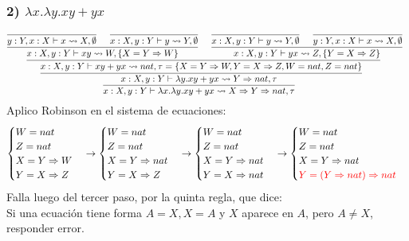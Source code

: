 \documentclass[a4paper,10pt]{article} %
\newcommand{\En}[0]{\Rightarrow}
\begin{document}
\subsubsection*{2) $\lambda x.\lambda y .xy+yx$}
$$
\infer[]{
\infer[]{
    \infer[]{x:X,y:Y\vdash \lambda x.\lambda y.xy+yx \leadsto X \En Y \En nat,\tau}{
        x:X,y:Y\vdash \lambda y.xy+yx \leadsto Y \En nat,\tau}}{
        x:X,y:Y\vdash xy+yx \leadsto nat, \tau =\{X=Y \En W,Y=X \En Z,W=nat,Z=nat\}}}
{
\infer[]{ x:X,y:Y\vdash xy \leadsto W,\{X=Y \En W\}}{
    \infer[]{y:Y,x:X\vdash x\leadsto X,\emptyset}{} & \infer[]{x:X,y:Y\vdash y\leadsto Y,\emptyset}{}}
&
\infer[]{ x:X,y:Y\vdash yx \leadsto Z,\{Y=X \En Z\}}{
\infer[]{x:X,y:Y\vdash y\leadsto Y,\emptyset}{} & \infer[]{y:Y,x:X\vdash x\leadsto X,\emptyset}{}}
}
$$
Aplico Robinson en el sistema de ecuaciones:
\begin{equation*}
    \begin{cases}
    W=nat\\
    Z=nat\\
    X=Y \En W \\
    Y=X \En Z \\
  \end{cases}
  \to
  \begin{cases}
    W=nat\\
    Z=nat\\
    X=Y \En nat \\
    Y=X \En Z \\
  \end{cases}
  \to
  \begin{cases}
    W=nat\\
    Z=nat\\
    X=Y \En nat \\
    Y=X \En nat \\
  \end{cases}
  \to
  \begin{cases}
    W=nat\\
    Z=nat\\
    X=Y \En nat \\
    \color{red}Y=(Y \En nat) \En nat \\
  \end{cases}
\end{equation*}
Falla luego del tercer paso, por la quinta regla, que dice:\\
Si una ecuación tiene forma $A = X, X = A$ y $X$ aparece en $A$, pero $A \neq X$,
responder error.
\end{document}
